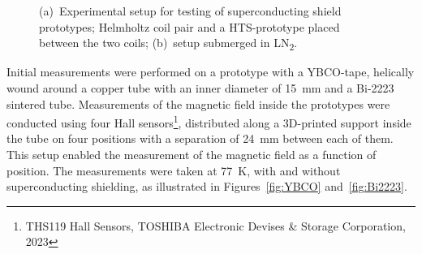 \begin{refsection}
\begin{figure}
    \centering
		\hfill
    \caption{(a)~Experimental setup for testing of superconducting shield prototypes; Helmholtz coil pair and a HTS-prototype placed between the two coils; (b)~setup submerged in LN\textsubscript{2}.}
    \label{fig:Setup}
\end{figure}

Initial measurements were performed on a prototype with a YBCO-tape, helically wound around a copper tube with an inner diameter of \SI{15}{mm} and a Bi-2223 sintered tube. Measurements of the magnetic field inside the prototypes were conducted using four Hall sensors\footnote{THS119 Hall Sensors, TOSHIBA Electronic Devises \& Storage Corporation, 2023}, distributed along a 3D-printed support inside the tube on four positions with a separation of \SI{24}{mm} between each of them. This setup enabled the measurement of the magnetic field as a function of position. The measurements were taken at \SI{77}{K}, with and without superconducting shielding, as illustrated in Figures~\ref{fig:YBCO} and~\ref{fig:Bi2223}.


\end{refsection}
